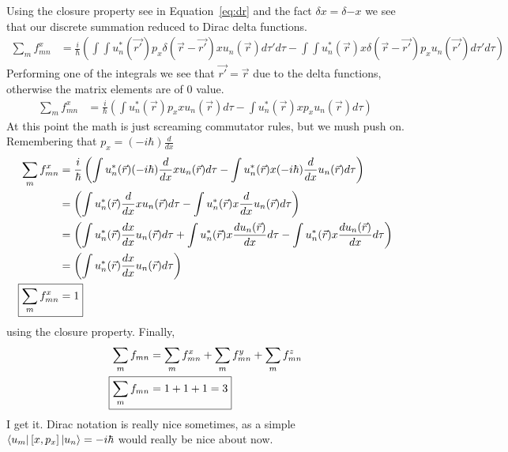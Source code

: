 \documentclass{jhwhw}
\begin{document}
Using the closure property see in Equation~\eqref{eq:dr} and the fact $\delta{x} = \delta{-x}$ we see that our discrete summation reduced to Dirac delta functions.
\begin{align}
    \sum\limits_m f_{mn}^x &= \frac{i}{\hbar}  
      \left(
      \int \int u_n^*(\vec{r'}) p_x \delta(\vec{r}-\vec{r'}) x u_n(\vec{r}) d\tau' d\tau - 
      \int \int u_n^*(\vec{r}) x \delta(\vec{r}-\vec{r'}) p_x u_n(\vec{r'}) d\tau' d\tau
      \right)
\end{align}
Performing one of the integrals we see that $\vec{r'} = \vec{r}$ due to the delta functions, otherwise the matrix elements are of 0 value.
\begin{align}
    \sum\limits_m f_{mn}^x &= \frac{i}{\hbar}  
      \left(
      \int u_n^*(\vec{r}) p_x x u_n(\vec{r}) d\tau - 
      \int u_n^*(\vec{r}) x p_x u_n(\vec{r}) d\tau
      \right)
\end{align}
At this point the math is just screaming commutator rules, but we mush push on.  Remembering that $p_x = (- i \hbar) \frac{d}{dx}$
\begin{align}
    \sum\limits_m f_{mn}^x &= \frac{i}{\hbar}  
      \left(
      \int u_n^*(\vec{r}) (- i \hbar) \frac{d}{dx} x u_n(\vec{r}) d\tau - 
      \int u_n^*(\vec{r}) x (- i \hbar) \frac{d}{dx} u_n(\vec{r}) d\tau
      \right) \\
      &= \left(
        \int u_n^*(\vec{r})  \frac{d}{dx} x u_n(\vec{r}) d\tau - 
        \int u_n^*(\vec{r}) x  \frac{d}{dx} u_n(\vec{r}) d\tau
        \right) \\
    &= \left(
    \int u_n^*(\vec{r})  \frac{dx}{dx} u_n(\vec{r})d\tau + \int u_n^*(\vec{r}) x \frac{d u_n(\vec{r})}{dx} d\tau - 
    \int u_n^*(\vec{r}) x  \frac{du_n(\vec{r})}{dx} d\tau
    \right) \\
    &= \left(
    \int u_n^*(\vec{r})  \frac{dx}{dx} u_n(\vec{r})d\tau
    \right) \\
    \Aboxed{\sum\limits_m f_{mn}^x &= 1}
\end{align}
using the closure property.  Finally,
\begin{align}
    \sum\limits_m f_{mn} &= \sum\limits_m f_{mn}^x + \sum\limits_m f_{mn}^y + \sum\limits_m f_{mn}^z \\
    \Aboxed{\sum\limits_m f_{mn} &= 1 + 1 + 1 = 3}
\end{align}
I get it.  Dirac notation is really nice sometimes, as a simple $\bra{u_m}[x,p_x]\ket{u_n} = -i \hbar$ would really be nice about now.

\pagebreak[4]
\end{document}
